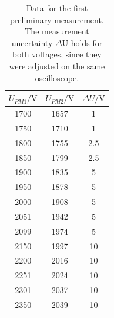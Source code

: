 \documentclass[english,  %
parskip=full,   %
headsepline]{scrartcl}
\begin{document}
\begin{table}[H]
    \centering
    \caption{Data for the first preliminary measurement. The measurement uncertainty $\Delta$U holds for both voltages, since they were adjusted on the same oscilloscope.}
    \begin{tabular}{c|c|c}
         $U_{PM1} / \si{\volt}$&$U_{PM2} / \si{\volt}$& $\Delta U / \si{\volt}$ \\ \hline \hline
         1700&1657&1\\
         1750&1710&1\\
         1800&1755&2.5\\
         1850&1799&2.5\\
         1900&1835&5\\
         1950&1878&5\\
         2000&1908&5\\
         2051&1942&5\\
         2099&1974&5\\
         2150&1997&10\\
         2200&2016&10\\
         2251&2024&10\\
         2301&2037&10\\
         2350&2039&10\\
    \end{tabular}
    \label{tab:vv1}
\end{table}
\end{document}
